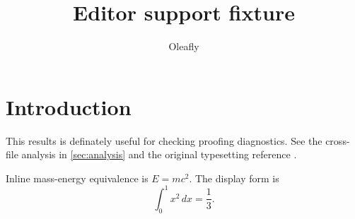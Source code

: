 \documentclass{article}
\title{Editor support fixture}
\author{Oleafly}
\begin{document}
\maketitle

\section{Introduction}\label{sec:introduction}
This results is definately useful for checking proofing diagnostics.
See the cross-file analysis in \autoref{sec:analysis} and the original
typesetting reference \cite{knuth1984}.

Inline mass-energy equivalence is \(E = mc^2\). The display form is
\[
  \int_0^1 x^2\,dx = \frac{1}{3}.
\]





\end{document}
